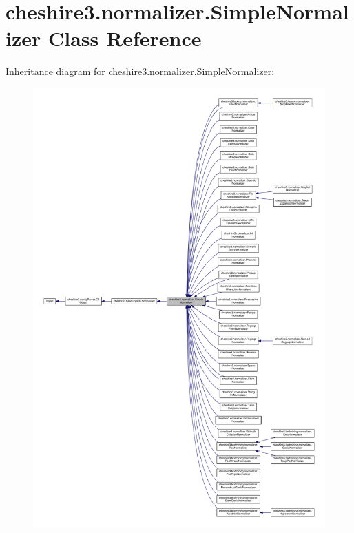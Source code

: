 \hypertarget{classcheshire3_1_1normalizer_1_1_simple_normalizer}{\section{cheshire3.\-normalizer.\-Simple\-Normalizer Class Reference}
\label{classcheshire3_1_1normalizer_1_1_simple_normalizer}
}


Inheritance diagram for cheshire3.\-normalizer.\-Simple\-Normalizer\-:
\nopagebreak
\begin{figure}[H]
\begin{center}
\leavevmode
\includegraphics[width=350pt]{classcheshire3_1_1normalizer_1_1_simple_normalizer__inherit__graph}
\end{center}
\end{figure}


